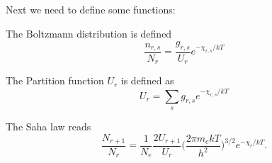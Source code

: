\documentclass{aa}   %
\begin{document}
Next we need to define some functions:

The Boltzmann distribution is defined
\begin{equation}
\frac{n_{r,s}}{N_r} = \frac{g_{r,s}}{U_r} e^{-\chi_{r,s}/kT} 
\end{equation}\label{Boltzmann}

The Partition function $U_r$ is defined as
\begin{equation}
 U_r = \sum_s g_{r,s} e^{-\chi_{r,s}/kT}
\end{equation}\label{Partition}

The Saha law reads
\begin{equation}
 \frac{N_{r+1}}{N_r} = \frac{1}{N_e}\frac{2U_{r+1}}{U_r}\bigg(\frac{2\pi m_e kT}{h^2}\bigg)^{3/2} e^{-\chi_r/kT}.
\end{equation}\label{Saha}
\end{document}
